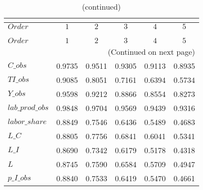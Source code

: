  
\begin{center}
\begin{longtable}{lccccc} 
\caption{COEFFICIENTS OF AUTOCORRELATION}\\
 \label{Table:th_autocorr_matrix}\\
\toprule 
$Order           $	 & 	 $         1$	 & 	 $         2$	 & 	 $         3$	 & 	 $         4$	 & 	 $         5$\\
\midrule \endfirsthead 
\caption{(continued)}\\
 \toprule \\ 
$Order           $	 & 	 $         1$	 & 	 $         2$	 & 	 $         3$	 & 	 $         4$	 & 	 $         5$\\
\midrule \endhead 
\midrule \multicolumn{6}{r}{(Continued on next page)} \\ \bottomrule \endfoot 
\bottomrule \endlastfoot 
$C\_obs          $	 & 	    0.9735	 & 	    0.9511	 & 	    0.9305	 & 	    0.9113	 & 	    0.8935 \\ 
$TI\_obs         $	 & 	    0.9085	 & 	    0.8051	 & 	    0.7161	 & 	    0.6394	 & 	    0.5734 \\ 
$Y\_obs          $	 & 	    0.9598	 & 	    0.9212	 & 	    0.8866	 & 	    0.8554	 & 	    0.8273 \\ 
$lab\_prod\_obs  $	 & 	    0.9848	 & 	    0.9704	 & 	    0.9569	 & 	    0.9439	 & 	    0.9316 \\ 
$labor\_share    $	 & 	    0.8849	 & 	    0.7546	 & 	    0.6436	 & 	    0.5489	 & 	    0.4683 \\ 
$L\_C            $	 & 	    0.8805	 & 	    0.7756	 & 	    0.6841	 & 	    0.6041	 & 	    0.5341 \\ 
$L\_I            $	 & 	    0.8690	 & 	    0.7342	 & 	    0.6179	 & 	    0.5178	 & 	    0.4318 \\ 
$L               $	 & 	    0.8745	 & 	    0.7590	 & 	    0.6584	 & 	    0.5709	 & 	    0.4947 \\ 
$p\_I\_obs       $	 & 	    0.8840	 & 	    0.7533	 & 	    0.6419	 & 	    0.5470	 & 	    0.4661 \\ 
\end{longtable}
 \end{center}
